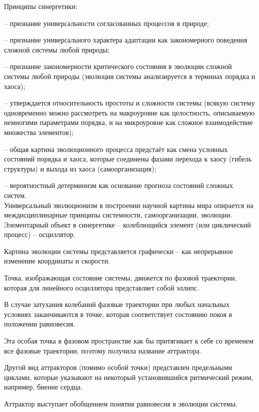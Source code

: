 \documentclass[exam_answers.tex]{subfiles}
\begin{document}
\renewcommand{\baselinestretch}{\blch}

Принципы синергетики:

-- признание универсальности согласованных процессов в природе;

-- признание универсального характера адаптации как закономерного поведения сложной системы любой природы;

-- признание закономерности критического состояния в эволюции сложной системы любой природы (эволюция системы анализируется в терминах порядка и хаоса);

-- утверждается относительность простоты и сложности системы (всякую систему одновременно можно рассмотреть на макроуровне как целостность, описываемую немногими параметрами порядка, и на микроуровне как сложное взаимодействие множества элементов);

-- общая картина эволюционного процесса предстаёт как смена условных состояний порядка и хаоса, которые соединены фазами перехода к хаосу (гибель структуры) и выхода из хаоса (самоорганизация);

-- вероятностный детерминизм как основание прогноза состояний сложных систем.
\\

Универсальный эволюционизм в построении научной картины мира опирается на междисциплинарные принципы системности, самоорганизации, эволюции.
\\

Элементарный объект в синергетике – колеблющийся элемент (или циклический процесс) – осциллятор.

Картина эволюции системы представляется графически – как непрерывное изменение координаты и скорости.

Точка, изображающая состояние системы, движется по фазовой траектории, которая для линейного осциллятора представляет собой эллипс.

В случае затухания колебаний фазовые траектории при любых начальных условиях заканчиваются в точке, которая соответствует состоянию покоя в положении равновесия.

Эта особая точка в фазовом пространстве как бы притягивает к себе со временем все фазовые траектории, поэтому получила название аттрактора.

Другой вид аттракторов (помимо особой точки) представлен предельными циклами, которые указывают на некоторый установившийся ритмический режим, например, биение сердца.

Аттрактор выступает обобщением понятия равновесия в эволюции системы.
\end{document}
